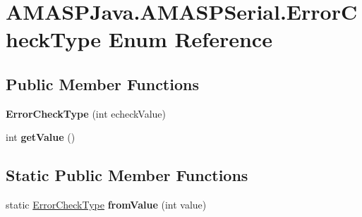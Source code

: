 \hypertarget{enum_a_m_a_s_p_java_1_1_a_m_a_s_p_serial_1_1_error_check_type}{}\section{A\+M\+A\+S\+P\+Java.\+A\+M\+A\+S\+P\+Serial.\+Error\+Check\+Type Enum Reference}
\label{enum_a_m_a_s_p_java_1_1_a_m_a_s_p_serial_1_1_error_check_type}
\subsection*{Public Member Functions}
\begin{DoxyCompactItemize}
\item 
\mbox{\label{enum_a_m_a_s_p_java_1_1_a_m_a_s_p_serial_1_1_error_check_type_a9bcb25c41d643675438d12cb85a850c1}} 
{\bfseries Error\+Check\+Type} (int echeck\+Value)
\item 
\mbox{\label{enum_a_m_a_s_p_java_1_1_a_m_a_s_p_serial_1_1_error_check_type_a97465edae72d3ee30886931578090ded}} 
int {\bfseries get\+Value} ()
\end{DoxyCompactItemize}
\subsection*{Static Public Member Functions}
\begin{DoxyCompactItemize}
\item 
\mbox{\label{enum_a_m_a_s_p_java_1_1_a_m_a_s_p_serial_1_1_error_check_type_ad89a9cefcfdca0ff4ff22ef370f446a0}} 
static \hyperlink{enum_a_m_a_s_p_java_1_1_a_m_a_s_p_serial_1_1_error_check_type}{Error\+Check\+Type} {\bfseries from\+Value} (int value)
\end{DoxyCompactItemize}
